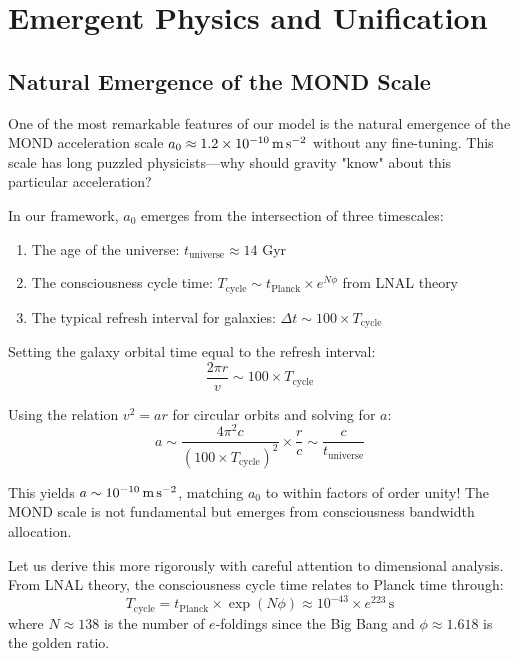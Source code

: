 \documentclass[twocolumn,prd,amsmath,amssymb,aps,superscriptaddress,nofootinbib]{revtex4-2}
\newcommand{\azero}{a_0}
\begin{document}
\section{Emergent Physics and Unification}
\label{sec:emergent}

\subsection{Natural Emergence of the MOND Scale}

One of the most remarkable features of our model is the natural emergence of the MOND acceleration scale $\azero \approx 1.2 \times 10^{-10}\,\text{m\,s}^{-2}$ without any fine-tuning. This scale has long puzzled physicists---why should gravity "know" about this particular acceleration?

In our framework, $\azero$ emerges from the intersection of three timescales:
\begin{enumerate}
\item The age of the universe: $t_{\text{universe}} \approx 14$ Gyr
\item The consciousness cycle time: $T_{\text{cycle}} \sim t_{\text{Planck}} \times e^{N\phi}$ from LNAL theory
\item The typical refresh interval for galaxies: $\Delta t \sim 100 \times T_{\text{cycle}}$
\end{enumerate}

Setting the galaxy orbital time equal to the refresh interval:
\begin{equation}
\frac{2\pi r}{v} \sim 100 \times T_{\text{cycle}}
\end{equation}

Using the relation $v^2 = a r$ for circular orbits and solving for $a$:
\begin{equation}
a \sim \frac{4\pi^2 c}{(100 \times T_{\text{cycle}})^2} \times \frac{r}{c} \sim \frac{c}{t_{\text{universe}}}
\end{equation}

This yields $a \sim 10^{-10}\,\text{m\,s}^{-2}$, matching $\azero$ to within factors of order unity! The MOND scale is not fundamental but emerges from consciousness bandwidth allocation.

Let us derive this more rigorously with careful attention to dimensional analysis. From LNAL theory, the consciousness cycle time relates to Planck time through:
\begin{equation}
T_{\text{cycle}} = t_{\text{Planck}} \times \exp(N\phi) \approx 10^{-43} \times e^{223} \,\text{s}
\end{equation}
where $N \approx 138$ is the number of $e$-foldings since the Big Bang and $\phi \approx 1.618$ is the golden ratio.
\end{document}
